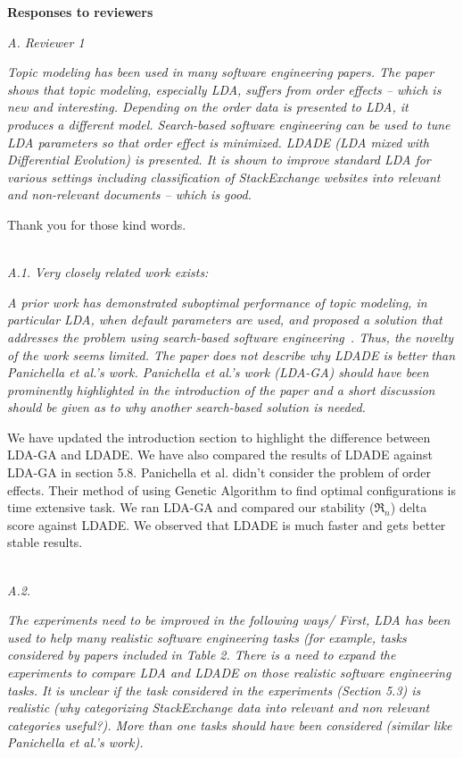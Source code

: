 \documentclass[conference]{IEEEtran}
\begin{document}
\pagestyle{plain}
\noindent
\textbf{Responses to reviewers\\}

\noindent
\textit{A. Reviewer 1}

\textit{Topic modeling has been used in many software engineering papers. The paper shows that topic modeling, especially LDA, suffers from order effects -- which is new and interesting. Depending on the order data is presented to LDA, it produces a different model. Search-based software engineering can be used to tune LDA parameters so that order effect is minimized. LDADE (LDA mixed with Differential Evolution) is presented. It is shown to improve standard LDA for various settings including classification of StackExchange websites into relevant and non-relevant documents -- which is good.}

Thank you for those kind words.

\noindent
\textit{\\A.1.}
\textit{Very closely related work exists:}

\textit{A prior work has demonstrated suboptimal performance of topic modeling, in particular LDA, when default parameters are used, and proposed a solution that addresses the problem using search-based software engineering~\cite{panichella2013effectively}. Thus, the novelty of the work seems limited. The paper does not describe why LDADE is better than Panichella et al.'s work. Panichella et al.'s work (LDA-GA) should have been prominently highlighted in the introduction of the paper and a short discussion should be given as to why another search-based solution is needed.\\}

We have updated the introduction section to highlight the difference between LDA-GA and LDADE. We have also compared the results of LDADE against LDA-GA in section 5.8.
Panichella et al. didn't consider the problem of order effects. Their method of using Genetic Algorithm to find optimal configurations is time extensive task. We ran LDA-GA and compared our stability ($\Re_n$) delta score against LDADE. We observed that LDADE is much faster and gets better stable results. 


\noindent
\textit{\\A.2.} 

\textit{The experiments need to be improved in the following ways/ First, LDA has been used to help many realistic software engineering tasks (for example, tasks considered by papers included in Table 2. There is a need to expand the experiments to compare LDA and LDADE on those realistic software engineering tasks. It is unclear if the task considered in the experiments (Section 5.3) is realistic (why categorizing StackExchange data into relevant and non relevant categories useful?). More than one tasks should have been considered (similar like Panichella et al.'s work).\\}
\end{document}

